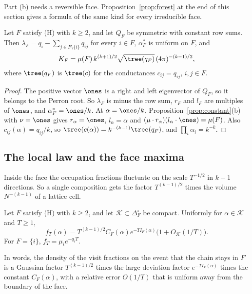 Part (b) needs a reversible face. Proposition~\ref{prop:forest} at the end of this section gives a
formula of the same kind for every irreducible face.

\begin{corollary}\label{cor:symface}
Let $F$ satisfy \textup{(H)} with $k\ge2$, and let $Q_F$ be symmetric with constant row sums.
Then $\lambda_F=q_i-\sum_{j\in F\setminus\{i\}}q_{ij}$ for every $i\in F$, $\alpha^*_F$ is uniform
on $F$, and
\[
K_F=\mu(F)\,k^{(k+1)/2}\sqrt{\tree(q_F)}\,(4\pi)^{-(k-1)/2},
\]
where $\tree(q_F)$ is $\tree(c)$ for the conductances $c_{ij}=q_{ij}$, $i,j\in F$.
\end{corollary}

\begin{proof}
The positive vector $\ones$ is a right and left eigenvector of $Q_F$, so it belongs to the
Perron root. So $\lambda_F$ is minus the row sum, $r_F$ and $l_F$ are multiples of $\ones$, and
$\alpha^*_F=\ones/k$.
At $\alpha=\ones/k$, Proposition~\ref{prop:constant}(b) with $\nu=\ones$ gives
$r_\alpha=\ones$, $l_\alpha=\alpha$ and $(\mu\cdot r_\alpha)(l_\alpha\cdot\ones)=\mu(F)$.
Also $c_{ij}(\alpha)=q_{ij}/k$, so $\tree(c(\alpha))=k^{-(k-1)}\tree(q_F)$, and
$\prod_i\alpha_i=k^{-k}$.
\end{proof}

\subsection{The local law and the face maxima}\label{sec:locallaw}

Inside the face the occupation fractions fluctuate on the scale $T^{-1/2}$ in $k-1$ directions. So
a single composition gets the factor $T^{(k-1)/2}$ times the volume $N^{-(k-1)}$ of a lattice cell.

\begin{theorem}\label{thm:local}
Let $F$ satisfy (H) with $k\ge2$, and let $\mathcal K\subset\Delta_F^\circ$ be
compact. Uniformly for $\alpha\in\mathcal K$ and $T\ge1$,
\[
f_T(\alpha)=T^{(k-1)/2}C_F(\alpha)e^{-TI_F(\alpha)}\bigl(1+O_{\mathcal K}(1/T)\bigr).
\]
For $F=\{i\}$, $f_T=\mu_ie^{-q_iT}$.
\end{theorem}

In words, the density of the visit fractions on the event that the chain stays
in $F$ is a Gaussian factor $T^{(k-1)/2}$ times the large-deviation factor
$e^{-TI_F(\alpha)}$ times the constant $C_F(\alpha)$, with a relative error
$O(1/T)$ that is uniform away from the boundary of the face.


